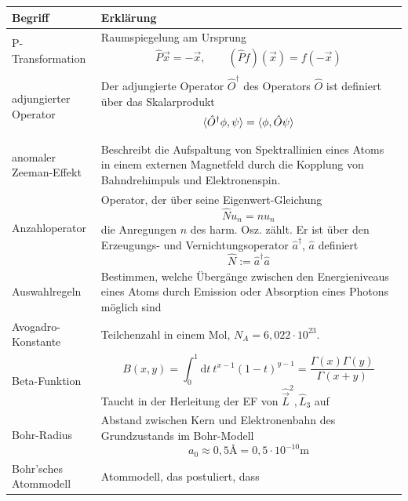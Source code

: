\documentclass{article}
\newcommand{\diff}{\mathrm{d}}
\begin{document}
\begin{xltabular}{\linewidth}{l|X}
	\hline\hline
		Begriff & Erklärung \\
	\hline
		P-Transformation & Raumspiegelung am Ursprung
			{\begin{align*}
				\hat{P}\vec{x} = -\vec{x}, \qquad (\hat{P} f)(\vec{x}) = f(-\vec{x})
			\end{align*}}\\
	\hline
		adjungierter Operator & Der adjungierte Operator $\hat{O}^\dagger$ des Operators $\hat{O}$ ist definiert über das Skalarprodukt
			$$\braket{\hat{O}^\dagger\phi, \psi} = \braket{\phi, \hat{O}\psi}$$ \\
	\hline
		anomaler Zeeman-Effekt & Beschreibt die Aufspaltung von Spektrallinien eines Atoms in einem externen Magnetfeld durch die Kopplung von Bahndrehimpuls und Elektronenspin.\\
	\hline
		Anzahloperator & Operator, der über seine Eigenwert-Gleichung
			$$\hat{N} u_n = n u_n$$		
		die Anregungen $n$ des harm. Osz. zählt. Er ist über den Erzeugungs- und Vernichtungsoperator $\hat{a}^\dagger$, $\hat{a}$ definiert
			$$\hat{N} := \hat{a}^\dagger\hat{a}$$ \\
	\hline
		Auswahlregeln & Bestimmen, welche Übergänge zwischen den Energieniveaus eines Atoms durch Emission oder Absorption eines Photons möglich sind \\
	\hline
		Avogadro-Konstante & Teilchenzahl in einem Mol, $N_A = 6,022\cdot 10^{23}$.\\
	\hline
		Beta-Funktion & 
		$$B(x,y) = \int_0^1 \diff t\ t^{x-1}(1 - t)^{y-1} = \frac{\Gamma(x) \Gamma(y)}{\Gamma(x + y)}$$
		\textcolor{gruen}{Taucht in der Herleitung der EF von $\hat{\vec{L}}^2, \hat{L}_3$ auf}\\
	\hline
		Bohr-Radius & Abstand zwischen Kern und Elektronenbahn des Grundzustands im Bohr-Modell
			$$a_0 \approx 0,5\text{\AA} = 0,5 \cdot 10^{-10}\text{m}$$ \\
	\hline
		Bohr'sches Atommodell & Atommodell, das postuliert, dass
	

\end{xltabular}
\end{document}
